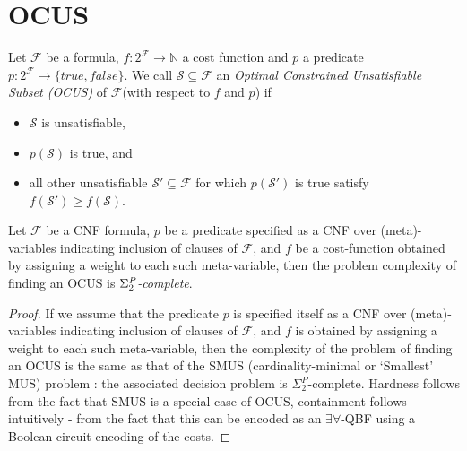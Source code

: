 \documentclass{llncs}
\newcommand\m[1]{\mathcal{#1}}
\newcommand\comment[1]{\marginpar{\tiny #1}}
\renewcommand\comment[1]{#1}
\newcommand{\tias}[1]{{\comment{\color{blue}Tias:#1}}}
\newcommand{\bart}[1]{{\comment{\color{OliveGreen}Bart: #1}}}
\newcommand\formula{\ensuremath{\m{F} }\xspace}
\newcommand\formulag{\ensuremath{\m{G} }\xspace}
\newcommand\mm[1]{\ensuremath{#1}\xspace}
\newcommand\nat{\mm{\mathbb{N}}}
\begin{document}
\section{OCUS}

\begin{definition}\label{definition:ocus}
	Let $\formula$ be a formula, $f:2^{\formula} \to \nat$ a cost function and  $p$ a predicate $p: 2^{\formula} \to \{\mathit{true}, \mathit{false} \}$. 
	We call %
		$\m{S} \subseteq \formula$ an \emph{Optimal Constrained Unsatisfiable Subset (OCUS)} of \formula (with respect to $f$ and $p$) if 
		\begin{itemize}%
			\item $\m{S}$ is unsatisfiable,
			\item $p(\m{S})$ is true, and
			\item all other unsatisfiable $\m{S}'\subseteq \formula$ for which $p(\m{S}')$ is true satisfy $f(\m{S}')\geq f(\m{S})$.
		\end{itemize}
\end{definition}
	
	\begin{proposition}
		Let \emph{\formula} be a CNF formula, ${p}$ be a predicate specified as a CNF over (meta)-variables indicating inclusion of clauses of \emph{\formula}, and ${f}$ be a cost-function obtained by assigning a weight to each such meta-variable, then the problem complexity of finding an OCUS is \emph{$\Sigma^\emph{P}_2$-complete}.
	\end{proposition}
\begin{proof}
	If we assume that the predicate $p$ is specified itself as a CNF over (meta)-variables indicating inclusion of clauses of $\m{F}$, and $f$ is obtained by assigning a weight to each such meta-variable, then the complexity of the problem of finding an OCUS is the same as that of the SMUS (cardinality-minimal or `Smallest' MUS) problem  \cite{ignatiev2015smallest}: the associated decision problem is $\Sigma^P_2$-complete.
	Hardness follows from the fact that SMUS is a special case of OCUS, containment follows - intuitively - from the fact that this can be encoded as an $\exists\forall$-QBF using a Boolean circuit encoding of the costs. 
\end{proof}
\end{document}
